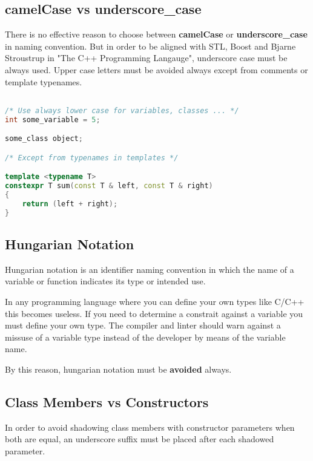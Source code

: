 \documentclass{article}
\begin{document}
\subsection{camelCase vs underscore\_case}

There is no effective reason to choose between \textbf{camelCase} or \textbf{underscore\_case} in
naming convention. But in order to be aligned with STL, Boost and Bjarne Stroustrup in
"The C++ Programming Langauge", underscore case must be always used. Upper case letters must be
avoided always except from comments or template typenames.

% 

\begin{lstlisting}[language=C++]

/* Use always lower case for variables, classes ... */
int some_variable = 5;

some_class object;

/* Except from typenames in templates */

template <typename T>
constexpr T sum(const T & left, const T & right)
{
	return (left + right);
}
\end{lstlisting}

\subsection{Hungarian Notation}

Hungarian notation is an identifier naming convention in which the name of a variable or function
indicates its type or intended use.

In any programming language where you can define your own types like C/C++ this becomes useless. If you
need to determine a constrait against a variable you must define your own type. The compiler and linter
should warn against a missuse of a variable type instead of the developer by means of the variable name.

By this reason, hungarian notation must be \textbf{avoided} always.

\subsection{Class Members vs Constructors}

In order to avoid shadowing class members with constructor parameters when both are equal, an underscore
suffix must be placed after each shadowed parameter.
\end{document}
